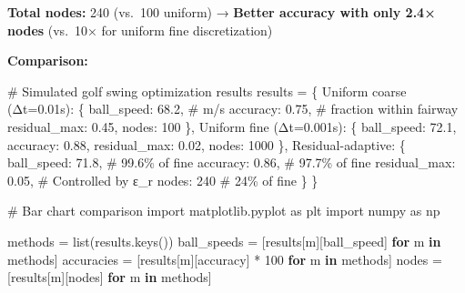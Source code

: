 \documentclass[
  letterpaper,
  DIV=11,
  numbers=noendperiod]{scrartcl}
\newenvironment{Shaded}{\begin{snugshade}}{\end{snugshade}}
\newcommand{\BuiltInTok}[1]{\textcolor[rgb]{0.00,0.23,0.31}{#1}}
\newcommand{\CommentTok}[1]{\textcolor[rgb]{0.37,0.37,0.37}{#1}}
\newcommand{\ControlFlowTok}[1]{\textcolor[rgb]{0.00,0.23,0.31}{\textbf{#1}}}
\newcommand{\DecValTok}[1]{\textcolor[rgb]{0.68,0.00,0.00}{#1}}
\newcommand{\FloatTok}[1]{\textcolor[rgb]{0.68,0.00,0.00}{#1}}
\newcommand{\ImportTok}[1]{\textcolor[rgb]{0.00,0.46,0.62}{#1}}
\newcommand{\KeywordTok}[1]{\textcolor[rgb]{0.00,0.23,0.31}{\textbf{#1}}}
\newcommand{\NormalTok}[1]{\textcolor[rgb]{0.00,0.23,0.31}{#1}}
\newcommand{\OperatorTok}[1]{\textcolor[rgb]{0.37,0.37,0.37}{#1}}
\newcommand{\StringTok}[1]{\textcolor[rgb]{0.13,0.47,0.30}{#1}}
\begin{document}
\textbf{Total nodes:} 240 (vs.~100 uniform) → \textbf{Better accuracy
with only 2.4× nodes} (vs.~10× for uniform fine discretization)

\textbf{Comparison:}

\begin{Shaded}
\begin{Highlighting}[]
\CommentTok{\# Simulated golf swing optimization results}
\NormalTok{results }\OperatorTok{=}\NormalTok{ \{}
    \StringTok{\textquotesingle{}Uniform coarse (Δt=0.01s)\textquotesingle{}}\NormalTok{: \{}
        \StringTok{\textquotesingle{}ball\_speed\textquotesingle{}}\NormalTok{: }\FloatTok{68.2}\NormalTok{,  }\CommentTok{\# m/s}
        \StringTok{\textquotesingle{}accuracy\textquotesingle{}}\NormalTok{: }\FloatTok{0.75}\NormalTok{,    }\CommentTok{\# fraction within fairway}
        \StringTok{\textquotesingle{}residual\_max\textquotesingle{}}\NormalTok{: }\FloatTok{0.45}\NormalTok{,}
        \StringTok{\textquotesingle{}nodes\textquotesingle{}}\NormalTok{: }\DecValTok{100}
\NormalTok{    \},}
    \StringTok{\textquotesingle{}Uniform fine (Δt=0.001s)\textquotesingle{}}\NormalTok{: \{}
        \StringTok{\textquotesingle{}ball\_speed\textquotesingle{}}\NormalTok{: }\FloatTok{72.1}\NormalTok{,}
        \StringTok{\textquotesingle{}accuracy\textquotesingle{}}\NormalTok{: }\FloatTok{0.88}\NormalTok{,}
        \StringTok{\textquotesingle{}residual\_max\textquotesingle{}}\NormalTok{: }\FloatTok{0.02}\NormalTok{,}
        \StringTok{\textquotesingle{}nodes\textquotesingle{}}\NormalTok{: }\DecValTok{1000}
\NormalTok{    \},}
    \StringTok{\textquotesingle{}Residual{-}adaptive\textquotesingle{}}\NormalTok{: \{}
        \StringTok{\textquotesingle{}ball\_speed\textquotesingle{}}\NormalTok{: }\FloatTok{71.8}\NormalTok{,  }\CommentTok{\# 99.6\% of fine}
        \StringTok{\textquotesingle{}accuracy\textquotesingle{}}\NormalTok{: }\FloatTok{0.86}\NormalTok{,    }\CommentTok{\# 97.7\% of fine}
        \StringTok{\textquotesingle{}residual\_max\textquotesingle{}}\NormalTok{: }\FloatTok{0.05}\NormalTok{,  }\CommentTok{\# Controlled by ε\_r}
        \StringTok{\textquotesingle{}nodes\textquotesingle{}}\NormalTok{: }\DecValTok{240}         \CommentTok{\# 24\% of fine}
\NormalTok{    \}}
\NormalTok{\}}

\CommentTok{\# Bar chart comparison}
\ImportTok{import}\NormalTok{ matplotlib.pyplot }\ImportTok{as}\NormalTok{ plt}
\ImportTok{import}\NormalTok{ numpy }\ImportTok{as}\NormalTok{ np}

\NormalTok{methods }\OperatorTok{=} \BuiltInTok{list}\NormalTok{(results.keys())}
\NormalTok{ball\_speeds }\OperatorTok{=}\NormalTok{ [results[m][}\StringTok{\textquotesingle{}ball\_speed\textquotesingle{}}\NormalTok{] }\ControlFlowTok{for}\NormalTok{ m }\KeywordTok{in}\NormalTok{ methods]}
\NormalTok{accuracies }\OperatorTok{=}\NormalTok{ [results[m][}\StringTok{\textquotesingle{}accuracy\textquotesingle{}}\NormalTok{] }\OperatorTok{*} \DecValTok{100} \ControlFlowTok{for}\NormalTok{ m }\KeywordTok{in}\NormalTok{ methods]}
\NormalTok{nodes }\OperatorTok{=}\NormalTok{ [results[m][}\StringTok{\textquotesingle{}nodes\textquotesingle{}}\NormalTok{] }\ControlFlowTok{for}\NormalTok{ m }\KeywordTok{in}\NormalTok{ methods]}


\end{Highlighting}
\end{Shaded}
\end{document}
